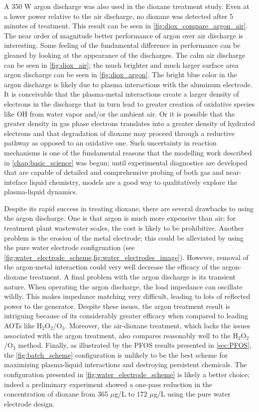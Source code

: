 A 350 W argon discharge was also used in the dioxane treatment study. Even at a lower power relative to the air discharge, no dioxane was detected after 5 minutes of treatment. This result can be seen in \cref{fig:diox_compare_argon_air}. The near order of magnitude better performance of argon over air discharge is interesting. Some feeling of the fundamental difference in performance can be gleaned by looking at the appearance of the discharges. The calm air discharge can be seen in \cref{fig:diox_air}; the much brighter and much larger surface area argon discharge can be seen in \cref{fig:diox_argon}. The bright blue color in the argon discharge is likely due to plasma interactions with the aluminum electrode. It is conceivable that the plasma-metal interactions create a larger density of electrons in the discharge that in turn lead to greater creation of oxidative species like OH from water vapor and/or the ambient air. Or it is possible that the greater density in gas phase electrons translates into a greater density of hydrated electrons and that degradation of dioxane may proceed through a reductive pathway as opposed to an oxidative one. Such uncertainty in reaction mechanisms is one of the fundamental reasons that the modelling work described in \cref{chap:basic_science} was begun; until experimental diagnostics are developed that are capable of detailed and comprehensive probing of both gas and near-inteface liquid chemistry, models are a good way to qualitatively explore the plasma-liquid dynamics.

Despite its rapid success in treating dioxane, there are several drawbacks to using the argon discharge. One is that argon is much more expensive than air; for treatment plant wastewater scales, the cost is likely to be prohibitive. Another problem is the erosion of the metal electrode; this could be alleviated by using the pure water electrode configruation (see \cref{fig:water_electrode_scheme,fig:water_electrodes_image}). However, removal of the argon-metal interaction could very well decrease the efficacy of the argon-dioxane treatment. A final problem with the argon discharge is its transient nature. When operating the argon discharge, the load impedance can oscillate wildly. This makes impedance matching very difficult, leading to lots of reflected power to the generator. Despite these issues, the argon treatment result is intriguing because of its considerably greater efficacy when compared to leading AOTs like H$_2$O$_2$/O$_3$. Moreover, the air-dioxane treatment, which lacks the issues associated with the argon treatment, also compares reasonably well to the H$_2$O$_2$/O$_3$ method. Finally, as illustrated by the PFOS results presented in \cref{sec:PFOS}, the \cref{fig:batch_scheme} configuration is unlikely to be the best scheme for maximizing plasma-liquid interactions and destroying persistent chemicals. The configuration presented in \cref{fig:water_electrode_scheme} is likely a better choice; indeed a preliminary experiment showed a one-pass reduction in the concentration of dioxane from 365 $\mu$g/L to 172 $\mu$g/L using the pure water electrode design.

